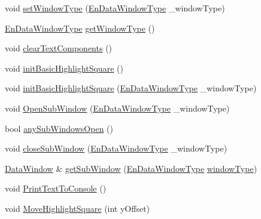 \begin{DoxyCompactItemize}
\item 
void \mbox{\hyperlink{class_data_window_acd1f484d18f8f32d419d23e05e89ea31}{set\+Window\+Type}} (\mbox{\hyperlink{_data_window_8hpp_a3c1e0c6fe947fdbea7502497b27cf44d}{En\+Data\+Window\+Type}} \+\_\+window\+Type)
\item 
\mbox{\hyperlink{_data_window_8hpp_a3c1e0c6fe947fdbea7502497b27cf44d}{En\+Data\+Window\+Type}} \mbox{\hyperlink{class_data_window_a84545c27ad784513eb4f830d4aeda82a}{get\+Window\+Type}} ()
\item 
void \mbox{\hyperlink{class_data_window_a2f7b8defc928dcf530149a82bdd16d53}{clear\+Text\+Components}} ()
\item 
void \mbox{\hyperlink{class_data_window_afd440dc420c7fdef23a1a52f0f1b40f1}{init\+Basic\+Highlight\+Square}} ()
\item 
void \mbox{\hyperlink{class_data_window_a1b1968cd0cbaaddcae7651e57f795e0c}{init\+Basic\+Highlight\+Square}} (\mbox{\hyperlink{_data_window_8hpp_a3c1e0c6fe947fdbea7502497b27cf44d}{En\+Data\+Window\+Type}} \+\_\+window\+Type)
\item 
void \mbox{\hyperlink{class_data_window_a3313c90eabd00824c775e3a23e82e3a9}{Open\+Sub\+Window}} (\mbox{\hyperlink{_data_window_8hpp_a3c1e0c6fe947fdbea7502497b27cf44d}{En\+Data\+Window\+Type}} \+\_\+window\+Type)
\item 
bool \mbox{\hyperlink{class_data_window_a141dab549c8f1e91304990ff1547476c}{any\+Sub\+Windows\+Open}} ()
\item 
void \mbox{\hyperlink{class_data_window_a1afcf0423ba1ad8b18792bb4ba73c314}{close\+Sub\+Window}} (\mbox{\hyperlink{_data_window_8hpp_a3c1e0c6fe947fdbea7502497b27cf44d}{En\+Data\+Window\+Type}} \+\_\+window\+Type)
\item 
\mbox{\hyperlink{class_data_window}{Data\+Window}} \& \mbox{\hyperlink{class_data_window_ab3ad6b28f3a4c54f692d623b4af48779}{get\+Sub\+Window}} (\mbox{\hyperlink{_data_window_8hpp_a3c1e0c6fe947fdbea7502497b27cf44d}{En\+Data\+Window\+Type}} \mbox{\hyperlink{class_data_window_a0ace2dac637e9483b554814128994dc7}{window\+Type}})
\item 
void \mbox{\hyperlink{class_data_window_a0092110104aa5506e15ac1dc1d3b0eac}{Print\+Text\+To\+Console}} ()
\item 
void \mbox{\hyperlink{class_data_window_a2047f47dfa6093e3f7c4bf30cd176a46}{Move\+Highlight\+Square}} (int y\+Offset)
\end{DoxyCompactItemize}
